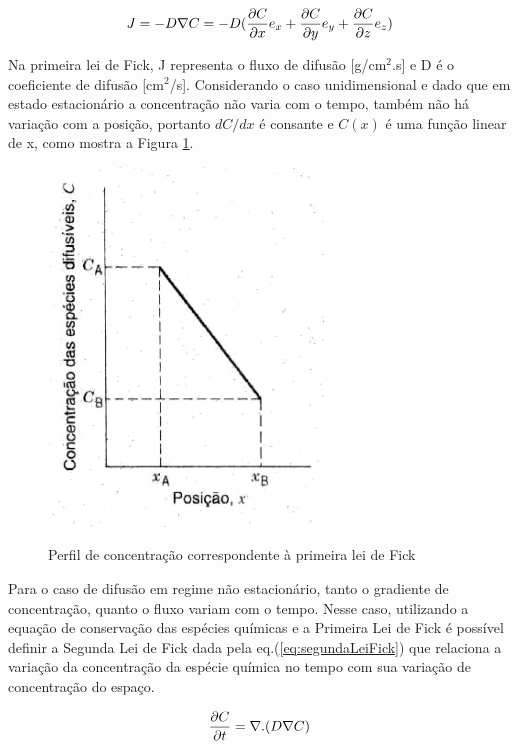 \documentclass[]{politex}
\begin{document}
\begin{equation} \label{eq:primeiraLeiFick}
J = -D\nabla C = -D(\pdv{C}{x}e_x + \pdv{C}{y}e_y + \pdv{C}{z}e_z)
\end{equation}

	Na primeira lei de Fick, J representa o fluxo de difusão [g/cm$^2$.s] e D é o coeficiente de difusão [cm$^2$/s]. Considerando o caso unidimensional e dado que em estado estacionário a concentração não varia com o tempo, também não há variação com a posição, portanto $dC/dx$ é consante e $C(x)$ é uma função linear de x, como mostra a Figura \ref{fig:primeiraLei}. \par
	
	\begin{figure}[ht]
	\caption{Perfil de concentração correspondente à primeira lei de Fick}
	\includegraphics{primeiraLei}
	\label{fig:primeiraLei}
	\centering
	\end{figure}

	Para o caso de difusão em regime não estacionário, tanto o gradiente de concentração, quanto o fluxo variam com o tempo. Nesse caso, utilizando a equação de conservação das espécies químicas e a Primeira Lei de Fick é possível definir a Segunda Lei de Fick dada pela eq.(\autoref{eq:segundaLeiFick}) que relaciona a variação da concentração da espécie química no tempo com sua variação de concentração do espaço. \par

\begin{equation} \label{eq:segundaLeiFick}
 \pdv{C}{t} = \nabla.(D\nabla C)
\end{equation}
\end{document}
